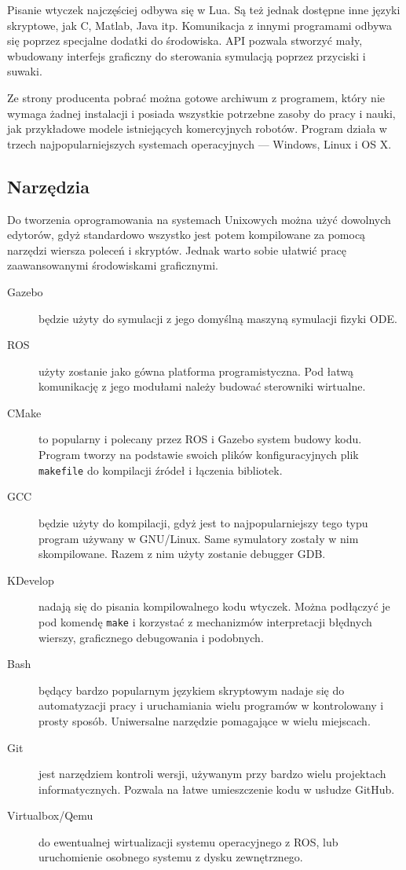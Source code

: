 	Pisanie wtyczek najczęściej odbywa się w Lua. Są też jednak dostępne inne języki skryptowe, jak C, Matlab, Java itp.
	Komunikacja z innymi programami odbywa się poprzez specjalne dodatki do środowiska.
	API pozwala stworzyć mały, wbudowany interfejs graficzny do sterowania symulacją poprzez przyciski i suwaki.

	Ze strony producenta pobrać można gotowe archiwum z programem, który nie wymaga żadnej instalacji i posiada wszystkie potrzebne zasoby do pracy i nauki, 
	jak przykładowe modele istniejących komercyjnych robotów.
	Program działa w trzech najpopularniejszych systemach operacyjnych --- Windows, Linux i OS X.

	
	\subsection{Narzędzia}
	Do tworzenia oprogramowania na systemach Unixowych można użyć dowolnych edytorów, gdyż standardowo wszystko jest potem kompilowane za pomocą narzędzi wiersza poleceń i skryptów.
	Jednak warto sobie ułatwić pracę zaawansowanymi środowiskami graficznymi.
	\begin{description}
	\item[Gazebo] będzie użyty do symulacji z jego domyślną maszyną symulacji fizyki ODE.
	\item[ROS] użyty zostanie jako gówna platforma programistyczna. Pod łatwą komunikację z jego modułami należy budować sterowniki wirtualne.
	\item[CMake] to popularny i polecany przez ROS i Gazebo system budowy kodu. Program tworzy na podstawie swoich plików konfiguracyjnych plik \texttt{makefile} do kompilacji źródeł i łączenia bibliotek.
	\item[GCC] będzie użyty do kompilacji, gdyż jest to najpopularniejszy tego typu program używany w GNU/Linux. Same symulatory zostały w nim skompilowane.
	Razem z nim użyty zostanie debugger GDB. 
	\item[KDevelop] nadają się do pisania kompilowalnego kodu wtyczek. Można podłączyć je pod komendę \texttt{make} i korzystać z mechanizmów interpretacji błędnych wierszy, graficznego debugowania i podobnych.
	\item[Bash] będący bardzo popularnym językiem skryptowym nadaje się do automatyzacji pracy i uruchamiania wielu programów w kontrolowany i prosty sposób.
	Uniwersalne narzędzie pomagające w wielu miejscach.
	\item[Git] jest narzędziem kontroli wersji, używanym przy bardzo wielu projektach informatycznych. Pozwala na łatwe umieszczenie kodu w usłudze GitHub.
	\item[Virtualbox/Qemu] do ewentualnej wirtualizacji systemu operacyjnego z ROS, lub uruchomienie osobnego systemu z dysku zewnętrznego.
	\end{description}

